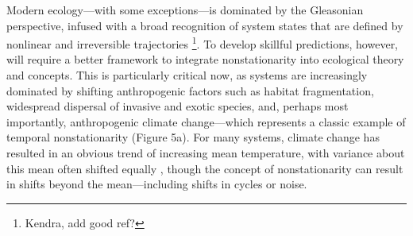 \documentclass[11pt,a4paper,oneside]{article}
\begin{document}
Modern ecology---with some exceptions---is dominated by the Gleasonian perspective, infused with a broad recognition of system states that are defined by nonlinear and irreversible trajectories \footnote{Kendra, add good ref?}. To develop skillful predictions, however, will require a better framework to integrate nonstationarity into ecological theory and concepts. This is particularly critical now, as systems are increasingly dominated by shifting anthropogenic factors such as habitat fragmentation, widespread dispersal of invasive and exotic species, and, perhaps most importantly, anthropogenic climate change---which represents a classic example of temporal nonstationarity (Figure 5a). For many systems, climate change has resulted in an obvious trend of increasing mean temperature, with variance about this mean often shifted equally \citep{Huntingford2013,Rhines2013}, though the concept of nonstationarity can result in shifts beyond the mean---including shifts in cycles or noise. \\
\end{document}
